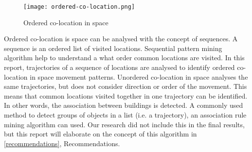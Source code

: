 \begin{figure}[H]
\centering
\texttt{[image: ordered-co-location.png]}
\captionsetup{justification=centering}
\caption{Ordered co-location in space}
\label{figure:colocation}
\end{figure}

Ordered co-location is space can be analysed with the concept of sequences. A sequence is an ordered list of visited locations. Sequential pattern mining algorithm help to understand a what order common locations are visited. In this report, trajectories of a sequence of locations are analysed to identify ordered co-location in space movement patterns.
Unordered co-location in space analyses the same trajectories, but does not consider direction or order of the movement. This means that common locations visited together in one trajectory can be identified. In other words, the association between buildings is detected. A commonly used method to detect groups of objects in a list (i.e. a trajectory), an association rule mining algorithm can used. Our research did not include this in the final results, but this report will elaborate on the concept of this algorithm in \autoref{recommendations}, Recommendations.